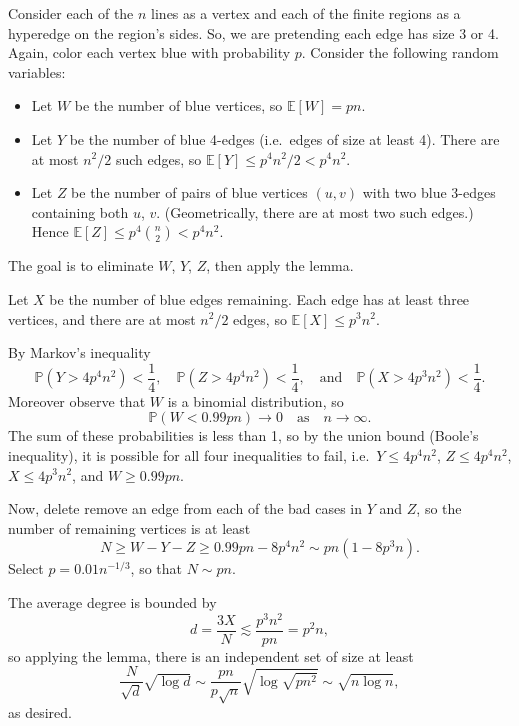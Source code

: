 Consider each of the $n$ lines as a vertex and each of the finite regions as a hyperedge on the region's sides. So, we are pretending each edge has size 3 or 4. Again, color each vertex blue with probability $p$. Consider the following random variables:
\begin{itemize}
    \item Let $W$ be the number of blue vertices, so $\mathbb E[W]=pn$.
    \item Let $Y$ be the number of blue 4-edges (i.e.\ edges of size at least 4). There are at most $n^2/2$ such edges, so $\mathbb E[Y]\le p^4n^2/2<p^4n^2$.
    \item Let $Z$ be the number of pairs of blue vertices $(u,v)$ with two blue 3-edges containing both $u$, $v$. (Geometrically, there are at most two such edges.) Hence $\mathbb E[Z]\le p^4\binom n2<p^4n^2$.
\end{itemize}
The goal is to eliminate $W$, $Y$, $Z$, then apply the lemma.

Let $X$ be the number of blue edges remaining. Each edge has at least three vertices, and there are at most $n^2/2$ edges, so $\mathbb E[X]\le p^3n^2$.

By Markov's inequality
\[\mathbb P\left(Y>4p^4n^2\right)<\frac14,\quad\mathbb P\left(Z>4p^4n^2\right)<\frac14,\quad\text{and}\quad\mathbb P\left(X>4p^3n^2\right)<\frac14.\]
Moreover observe that $W$ is a binomial distribution, so
\[\mathbb P(W<0.99pn)\to0\quad\text{as}\quad n\to\infty.\]
The sum of these probabilities is less than 1, so by the union bound (Boole's inequality), it is possible for all four inequalities to fail, i.e.\ $Y\le4p^4n^2$, $Z\le4p^4n^2$, $X\le4p^3n^2$, and $W\ge0.99pn$.

Now, delete remove an edge from each of the bad cases in $Y$ and $Z$, so the number of remaining vertices is at least
\[N\ge W-Y-Z\ge0.99pn-8p^4n^2\sim pn\left(1-8p^3n\right).\]
Select $p=0.01n^{-1/3}$, so that $N\sim pn$.

The average degree is bounded by
\[d=\frac{3X}N\lesssim\frac{p^3n^2}{pn}=p^2n,\]
so applying the lemma, there is an independent set of size at least
\[\frac N{\sqrt d}\sqrt{\log d}\sim\frac{pn}{p\sqrt n}\sqrt{\log\sqrt{pn^2}}\sim\sqrt{n\log n},\]
as desired.

